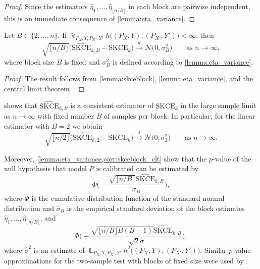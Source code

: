 \documentclass{article}
\DeclareMathOperator{\Exp}{\mathbb{E}}
\DeclareMathOperator{\Var}{\mathbb{V}}
\begin{document}
\begin{proof}
Since the estimators $\widehat{\eta}_1, \ldots, \widehat{\eta}_{\lfloor n/B \rfloor}$
in each block are pairwise independent, this is an immediate consequence of
\cref{lemma:eta_variance}.
\end{proof}

\begin{corollary}\label{corr:skceblock_clt}
    Let $B \in \{2, \ldots, n\}$.
    If $\Var_{P_X,Y,P_{X'},Y'} h\big((P_X, Y), (P_{X'}, Y')\big) < \infty$,
    then
    \begin{equation*}
        \sqrt{\lfloor n / B \rfloor} \big(\widehat{\mathrm{SKCE}}_{k,B} - \mathrm{SKCE}_k\big) \xrightarrow{d} \mathcal{N}\big(0, \sigma^2_B\big) \qquad \text{as } n \to \infty,
    \end{equation*}
    where block size $B$ is fixed and $\sigma^2_B$ is
    defined according to \cref{lemma:eta_variance}.
\end{corollary}

\begin{proof}
    The result follows from \cref{lemma:skceblock}, \cref{lemma:eta_variance},
    and the central limit theorem~\citep[see, e.g.,][Theorem~A in Section~1.9]{Serfling1980}.
\end{proof}

\begin{remark}\label{remark:skceb_fixed}
     shows that $\widehat{\mathrm{SKCE}}_{k,B}$ is a consistent
    estimator of $\mathrm{SKCE}_k$ in the large sample limit as $n \to \infty$ with
    fixed number $B$ of samples per block. In particular, for the linear estimator with
    $B = 2$ we obtain
    \begin{equation*}
        \sqrt{\lfloor n / 2 \rfloor} \big(\widehat{\mathrm{SKCE}}_{k,2} - \mathrm{SKCE}_k\big) \xrightarrow{d} \mathcal{N}\big(0, \sigma^2_2\big) \qquad \text{as } n \to \infty.
    \end{equation*}

    Moreover, \cref{lemma:eta_variance,corr:skceblock_clt}
    show that the $p$-value of the null hypothesis that model $P$ is calibrated can be
    estimated by
    \begin{equation*}
        \Phi\bigg(-\frac{ \sqrt{\lfloor n / B \rfloor} \widehat{\mathrm{SKCE}}_{k,B}}{\widehat{\sigma}_B} \bigg),
    \end{equation*}
    where $\Phi$ is the cumulative distribution function of the standard normal
    distribution and $\widehat{\sigma}_B$ is the empirical standard deviation of the
    block estimates $\widehat{\eta}_1,\ldots, \widehat{\eta}_{\lfloor n / B \rfloor}$,
    and
    \begin{equation*}
        \Phi\bigg(- \frac{\sqrt{\lfloor n / B \rfloor B (B-1)}\widehat{\mathrm{SKCE}}_{k,B}}{\sqrt{2}\widehat{\sigma}}\bigg),
    \end{equation*}
    where $\widehat{\sigma}^2$ is an estimate of $\Exp_{P_X,Y,P_{X'},Y'} h^2\big((P_X,Y), (P_{X'},Y')\big)$.
    Similar $p$-value approximations for the two-sample test with blocks of fixed
    size were used by \citet{Chwialkowski2015}.
\end{remark}
\end{document}
